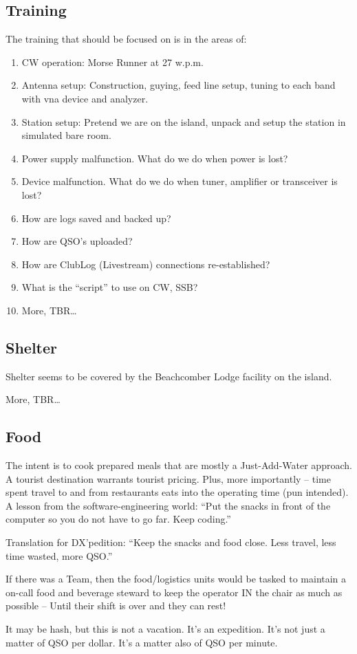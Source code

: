 \documentclass[11pt]{article}
\begin{document}
\subsection{Training}

The training that should be focused on is in the areas of:

\begin{enumerate}
\item CW operation: Morse Runner at 27 w.p.m.
\item Antenna setup: Construction, guying, feed line setup, tuning to
each band with {\gls{vna}} device and analyzer.
\item Station setup: Pretend we are on the island, unpack and setup the station
in simulated bare room.
\item Power supply malfunction.  What do we do when power is lost?
\item Device malfunction. What do we do when tuner, amplifier or transceiver
is lost?
\item How are logs saved and backed up?
\item How are QSO's uploaded?
\item How are ClubLog (Livestream) connections re-established?
\item What is the ``script'' to use on CW, SSB?
\item More, TBR\ldots
\end{enumerate}

\subsection{Shelter}

Shelter seems to be covered by the Beachcomber Lodge facility on
the island.

\par
More, TBR\ldots

\subsection{Food}

The intent is to cook prepared meals that are mostly a Just-Add-Water
approach.  A tourist destination warrants tourist pricing.  Plus,
more importantly -- time spent travel to and from restaurants
eats into the operating time (pun intended).   A lesson from
the software-engineering world:  ``Put the snacks in front
of the computer so you do not have to go far. Keep coding.''
\par
Translation for DX'pedition: ``Keep the snacks and food close. Less
travel, less time wasted, more QSO.''
\par
If there was a Team, then the food/logistics units would be
tasked to maintain a on-call food and beverage steward to keep
the operator IN the chair as much as possible -- Until their shift
is over and they can rest!
\par
It may be hash, but this is not a vacation. It's an expedition.  It's not
just a matter of QSO per dollar.  It's a matter also of QSO per minute.
\par
\end{document}
